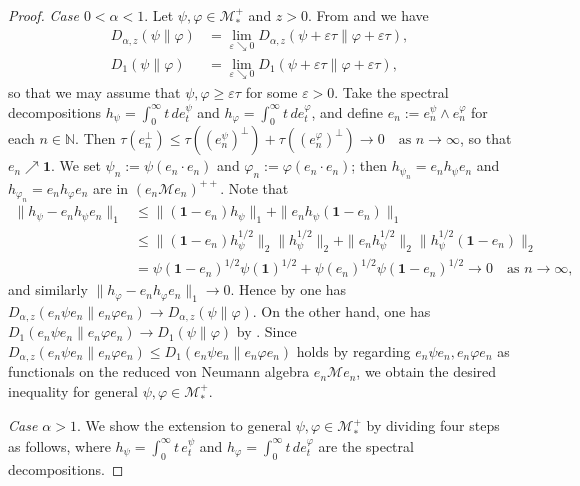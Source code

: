 \documentclass[12pt]{article}
\theoremstyle{definition}
\theoremstyle{remark}
\numberwithin{equation}{section}
\def\Me{\mathcal M}
\def\ffi{\varphi}
\def\1{\mathbf{1}}
\def\eps{\varepsilon}
\def\bN{\mathbb{N}}
\begin{document}
\begin{proof}
{\it Case $0<\alpha<1$}.\enspace
Let $\psi,\ffi\in\Me_*^+$ and $z>0$. From \cite[Theorem 1(iv)]{kato2023onrenyi} and
\cite[Corollary 2.8(3)]{hiai2021quantum} we have
\begin{align*}
D_{\alpha,z}(\psi\|\ffi)&=\lim_{\eps\searrow0}D_{\alpha,z}(\psi+\eps\tau\|\ffi+\eps\tau), \\
D_1(\psi\|\ffi)&=\lim_{\eps\searrow0}D_1(\psi+\eps\tau\|\ffi+\eps\tau),
\end{align*}
so that we may assume that $\psi,\ffi\ge\eps\tau$ for some $\eps>0$. Take the spectral decompositions
$h_\psi=\int_0^\infty t\,de_t^\psi$ and $h_\ffi=\int_0^\infty t\,de_t^\ffi$, and define
$e_n:=e_n^\psi\wedge e_n^\ffi$ for each $n\in\bN$. Then
$\tau(e_n^\perp)\le\tau((e_n^\psi)^\perp)+\tau((e_n^\ffi)^\perp)\to0\quad\mbox{as $n\to\infty$}$,  so that
$e_n\nearrow\1$. We set $\psi_n:=\psi(e_n\cdot e_n)$ and $\ffi_n:=\ffi(e_n\cdot e_n)$; then
$h_{\psi_n}=e_nh_\psi e_n$ and $h_{\ffi_n}=e_nh_\ffi e_n$ are in $(e_n\Me e_n)^{++}$. Note that
\begin{align*}
\|h_\psi-e_nh_\psi e_n\|_1&\le\|(\1-e_n)h_\psi\|_1+\|e_nh_\psi(\1-e_n)\|_1 \\
&\le\|(\1-e_n)h_\psi^{1/2}\|_2\|h_\psi^{1/2}\|_2+\|e_nh_\psi^{1/2}\|_2\|h_\psi^{1/2}(\1-e_n)\|_2 \\
&=\psi(\1-e_n)^{1/2}\psi(\1)^{1/2}+\psi(e_n)^{1/2}\psi(\1-e_n)^{1/2}\to0\quad\mbox{as $n\to\infty$},
\end{align*}
and similarly $\|h_\ffi-e_nh_\ffi e_n\|_1\to0$. Hence by \cite[Theorem 1(iv)]{kato2023onrenyi} one has
$D_{\alpha,z}(e_n\psi e_n\|e_n\ffi e_n)\to D_{\alpha,z}(\psi\|\ffi)$. On the other hand, one has
$D_1(e_n\psi e_n\|e_n\ffi e_n)\to D_1(\psi\|\ffi)$ by \cite[Proposition 2.10]{hiai2021quantum}. Since
$D_{\alpha,z}(e_n\psi e_n\|e_n\ffi e_n)\le D_1(e_n\psi e_n\|e_n\ffi e_n)$ holds by regarding
$e_n\psi e_n,e_n\ffi e_n$ as functionals on the reduced von Neumann algebra $e_n\Me e_n$, we obtain
the desired inequality for general $\psi,\ffi\in\Me_*^+$.

{\it Case $\alpha>1$}.\enspace
We show the extension to general $\psi,\ffi\in\Me_*^+$ by dividing four steps as follows, where
$h_\psi=\int_0^\infty t\,e_t^\psi$ and $h_\ffi=\int_0^\infty t\,de_t^\ffi$ are the spectral decompositions.


\end{proof}
\end{document}
